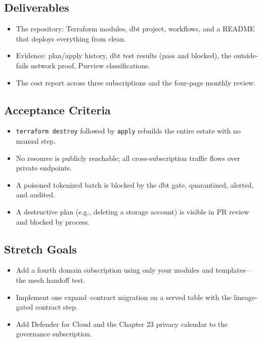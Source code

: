 \subsection*{Deliverables}
\begin{itemize}
    \item The repository: Terraform modules, dbt project, workflows, and a README that deploys everything from clean.
    \item Evidence: plan/apply history, dbt test results (pass and blocked), the outside-fails network proof, Purview classifications.
    \item The cost report across three subscriptions and the four-page monthly review.
\end{itemize}

\subsection*{Acceptance Criteria}
\begin{itemize}
    \item \texttt{terraform destroy} followed by \texttt{apply} rebuilds the entire estate with no manual step.
    \item No resource is publicly reachable; all cross-subscription traffic flows over private endpoints.
    \item A poisoned tokenized batch is blocked by the dbt gate, quarantined, alerted, and audited.
    \item A destructive plan (e.g., deleting a storage account) is visible in PR review and blocked by process.
\end{itemize}

\subsection*{Stretch Goals}
\begin{itemize}
    \item Add a fourth domain subscription using only your modules and templates---the mesh handoff test.
    \item Implement one expand--contract migration on a served table with the lineage-gated contract step.
    \item Add Defender for Cloud and the Chapter 23 privacy calendar to the governance subscription.
\end{itemize}

